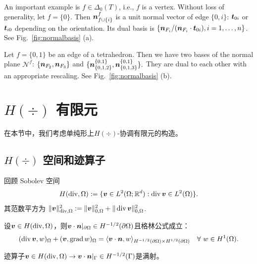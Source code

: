 \begin{example}\rm
An important example is $f\in \Delta_0(T)$, i.e., $f$ is a vertex. Without loss of generality, let $f = \{0\}$. Then $\boldsymbol n_{f\cup\{i\}}^f$ is a unit normal vector of edge $\{0,i\}$: $\boldsymbol t_{0i}$ or $\boldsymbol t_{i0}$ depending on the orientation. Its dual basis is $\{\boldsymbol n_{F_i}/(\boldsymbol n_{F_i}\cdot \boldsymbol t_{0i}), i=1, \ldots, n\}$. See Fig.~\ref{fig:normalbasis} (a).
\end{example}


\begin{example}\rm
 Let $f = \{0,1\}$ be an edge of a tetrahedron. Then we have two bases of the normal plane $\mathscr N^f$: $\{\boldsymbol n_{F_2}, \boldsymbol n_{F_3}\}$ and $\{ \boldsymbol n^{\{0,1\}}_{\{0,1,2\}}, \boldsymbol n^{\{0,1\}}_{\{0,1,3\}}\}.$ They are dual to each other with an appropriate rescaling. See Fig.~\ref{fig:normalbasis} (b). 
\end{example}


\section{$H(\div)$ 有限元}
在本节中，我们考虑单纯形上$H(\div)$-协调有限元的构造。

\subsection{$H(\div)$ 空间和迹算子}
回顾 Sobolev 空间
\[
H(\operatorname{div},\Omega):=\{\boldsymbol v\in L^2(\Omega;\mathbb R^d): \operatorname{div}\boldsymbol v\in L^2(\Omega)\}.
\]
其范数平方为 $\|\boldsymbol v\|_{\operatorname{div}, \Omega}^2:=\|\boldsymbol v\|_{0, \Omega}^2+\|\operatorname{div}\boldsymbol v\|_{0, \Omega}^2$.
\begin{lemma}
设$\boldsymbol v\in H(\operatorname{div},\Omega)$，则$\boldsymbol v\cdot\boldsymbol n|_{\partial\Omega}\in H^{-1/2}(\partial\Omega)$且格林公式成立：
\[
(\operatorname{div}\boldsymbol v, w)_{\Omega} + (\boldsymbol v, \operatorname{grad} w)_{\Omega}=\langle\boldsymbol v\cdot\boldsymbol n, w\rangle_{H^{-1/2}(\partial\Omega)\times H^{1/2}(\partial\Omega)}\quad\forall~w\in H^1(\Omega).
\]
\end{lemma}

\begin{lemma}
迹算子$\boldsymbol v\in H(\operatorname{div},\Omega)\to\boldsymbol v\cdot\boldsymbol n|_{\Gamma}\in H^{-1/2}(\Gamma)$是满射。
\end{lemma}



